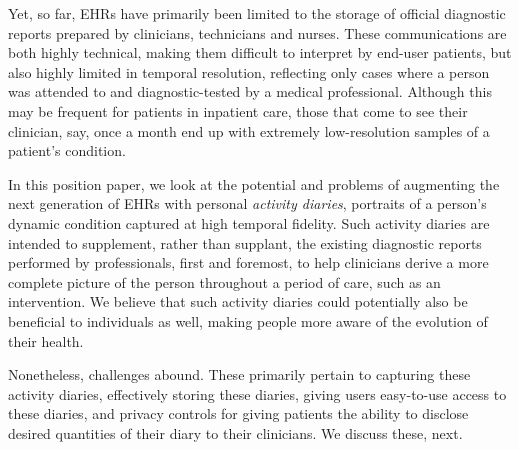 \documentclass{chi-ext}
\begin{document}




Yet, so far, EHRs have primarily been limited to the storage of
official diagnostic reports prepared by clinicians, technicians and
nurses.  These communications are both highly technical, making them
difficult to interpret by end-user patients, but also highly limited
in temporal resolution, reflecting only cases where a person was
attended to and diagnostic-tested by a medical professional.  Although
this may be frequent for patients in inpatient care, those that come
to see their clinician, say, once a month end up with extremely
low-resolution samples of a patient's condition.

In this position paper, we look at the potential and problems of
augmenting the next generation of EHRs with personal \emph{activity
  diaries}, portraits of a person's dynamic condition captured at high
temporal fidelity.  Such activity diaries are intended to supplement,
rather than supplant, the existing diagnostic reports performed by
professionals, first and foremost, to help clinicians derive a more
complete picture of the person throughout a period of care, such as an
intervention.  We believe that such activity diaries could potentially
also be beneficial to individuals as well, making people more aware of
the evolution of their health.

Nonetheless, challenges abound. These primarily pertain to capturing
these activity diaries, effectively storing these diaries, giving
users easy-to-use access to these diaries, and privacy controls for
giving patients the ability to disclose desired quantities of their
diary to their clinicians.  We discuss these, next.
\end{document}
